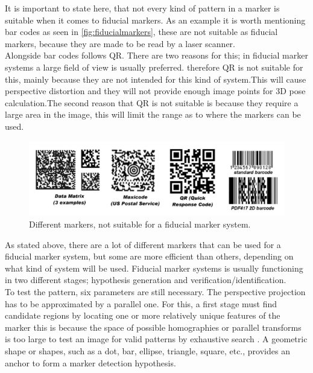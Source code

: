 			It is important to state here, that not every kind of pattern in a marker is suitable when it comes to fiducial markers\cite{fiducialMarkers}. As an example it is worth mentioning bar codes as seen in \autoref{fig:fiducialmarkers}, these are not suitable as fiducial markers, because they are made to be read by a laser scanner.\\
			Alongside bar codes follows QR. There are two reasons for this; in fiducial marker systems a large field of view is usually preferred. therefore QR is not suitable for this, mainly because they are not intended for this kind of system.This will cause perspective distortion and they will not provide enough image points for 3D pose calculation.The second reason that QR is not suitable is because they require a large area in the image, this will limit the range as to where the markers can be used.\\ 
			
			
			\begin{figure}[H]
				\centering
				\includegraphics[width=0.9\linewidth]{figure/Analysis/fiducialmarkers.png}
				\caption{Different markers, not suitable for a fiducial marker system.}
				\label{fig:fiducialmarkers}
			\end{figure}
			
			
			As stated above, there are a lot of different markers that can be used for a fiducial marker system, but some are more efficient than others, depending on what kind of system will be used.
			Fiducial marker systems is usually functioning in two different stages; hypothesis generation and verification/identification.\\
			
			To test the pattern, six parameters are still necessary. The perspective projection has to be approximated by a parallel one. For this, a first stage must find candidate regions by locating one or more relatively unique features of the marker this is because the space of possible homographies or parallel transforms is too large to test an image for valid patterns by exhaustive search \cite{fiducialMarkers}.
			A geometric shape or shapes, such as a dot, bar, ellipse, triangle, square, etc., provides an anchor to form a marker detection hypothesis.\\
			
